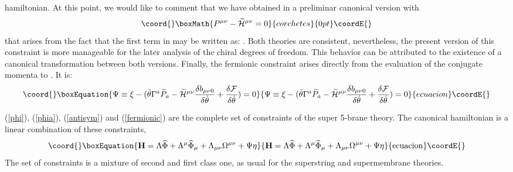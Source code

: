 \documentclass[a4paper,12pt]{article}
\def\CH{\widetilde{\cal{H}}}
\def\btheta{\bar{\theta}}
\def\CF{\cal{F}}
\def\wp{\widetilde{P}}
\begin{document}
hamiltonian.  At this point, we would like to comment that we have
obtained in \cite{congreso} a preliminar canonical version with
\[\coord{}\boxMath{P^{\mu\nu}-{\CH}^{\mu\nu}=0
}{corchetes}{0pt}\coordE{}\] that arises from the fact that the first term in \coordHE{} may be
written as: \coordHE{}. Both theories are consistent,
nevertheless, the present version of this constraint is more
manageable for the later analysis of the chiral degrees of
freedom. This behavior can be attributed to the existence of a
canonical transformation between both versions. Finally, the
fermionic constraint arises directly from the evaluation of the
conjugate momenta \myHighlight{$\xi$}\coordHE{} to \myHighlight{$\theta$}\coordHE{}. It is:
\begin{equation}\coord{}\boxEquation{\label{fermionic}
\Psi\equiv\xi-(\btheta\Gamma^a \wp_a-{\CH^{\mu\nu}}\frac{\delta
b_{\mu\nu0}}{\delta\dot{\theta}}+\frac{\delta
{\CF}}{\delta\dot{\theta}})=0
}{\Psi\equiv\xi-(\btheta\Gamma^a \wp_a-{\CH^{\mu\nu}}\frac{\delta
b_{\mu\nu0}}{\delta\dot{\theta}}+\frac{\delta
{\CF}}{\delta\dot{\theta}})=0
}{ecuacion}\coordE{}\end{equation}

(\ref{phi}), (\ref{phia}), (\ref{antisym}) and (\ref{fermionic})
are the complete set of constraints of the super 5-brane theory.
The canonical hamiltonian is a linear combination of these
constraints,
\begin{equation}\coord{}\boxEquation{\label{canham}
\rm{\bf{H}}=\Lambda\widehat{\Phi}+\Lambda^\mu\widehat{\Phi}_\mu+\Lambda_{\mu\nu}\Omega^{\mu\nu}+\Psi\eta
}{\rm{\bf{H}}=\Lambda\widehat{\Phi}+\Lambda^\mu\widehat{\Phi}_\mu+\Lambda_{\mu\nu}\Omega^{\mu\nu}+\Psi\eta
}{ecuacion}\coordE{}\end{equation}
The set of constraints is a mixture of second and first class one,
as usual for the superstring and supermembrane theories.
\end{document}
